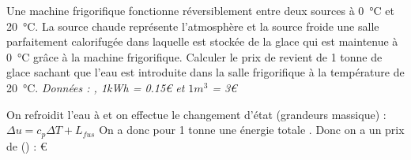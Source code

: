 \begin{Exercise}[title=Congélateur]
  Une machine frigorifique fonctionne réversiblement entre deux sources à \SI{0}{\degreeCelsius} et \SI{20}{\degreeCelsius}. La source chaude représente l’atmosphère et la source froide une salle parfaitement calorifugée dans laquelle est stockée de la glace qui est maintenue à \SI{0}{\degreeCelsius} grâce à la machine frigorifique.
  Calculer le prix de revient de 1 tonne de glace sachant que l’eau est introduite dans la salle frigorifique à la température de \SI{20}{\degreeCelsius}.
		\emph{Données : ,  1kWh = 0.15\euro{} et $1m^3$ = 3\euro{}}
\end{Exercise}
\begin{Answer}
		On refroidit l'eau à  et on effectue le changement d'état (grandeurs massique) :
		$\Delta u = c_p \Delta T + L_{fus}$
		On a donc pour 1 tonne une énergie totale . Donc on a un prix de () : \euro{}
\end{Answer}
